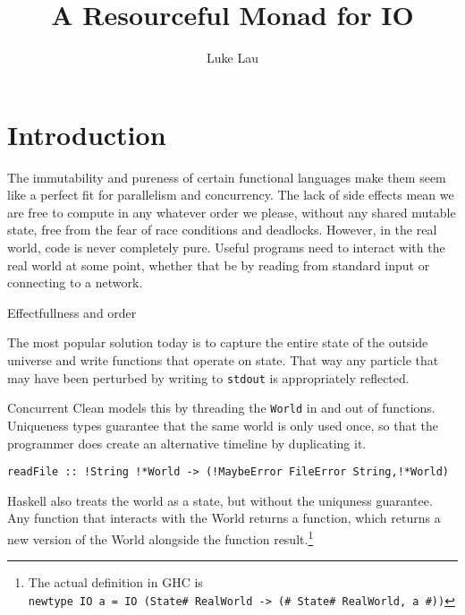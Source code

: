 \documentclass{report}
\begin{document}
\newcommand{\llbracket}{[\![}
\newcommand{\rrbracket}{]\!]}
\newcommand{\IO}{\mathsf{IO}}
\newcommand{\bind}{>\!\!>\!\!=} \newcommand{\concbind}{>\!\!>\!>\!\!=}
\newcommand{\subtyp}{\geq:}
\newcommand{\notsubtyp}{\ngeq:}
\newcommand{\lift}[1]{\ensuremath{\llbracket#1\rrbracket}}
\newcommand{\use}[2]{\ensuremath{\llbracket#2\rrbracket_{#1}}}

\author{Luke Lau}
\title{A Resourceful Monad for IO}
\begin{titlepage}
  \maketitle
\end{titlepage}

\chapter{Introduction}
The immutability and pureness of certain functional languages make them seem
like a perfect fit for parallelism and concurrency. The lack of side effects
mean we are free to compute in any whatever order we please, without any shared
mutable state, free from the fear of race conditions and deadlocks. However, in
the real world, code is never completely pure. Useful programs need to interact
with the real world at some point, whether that be by reading from standard
input or connecting to a network. 

Effectfullness and order

The most popular solution today is to capture the entire state of the outside
universe and write functions that operate on state. That way any particle that
may have been perturbed by writing to \texttt{stdout} is appropriately reflected.

Concurrent Clean models this by threading the \texttt{World} in and out of
functions. Uniqueness types guarantee that the same world is only used once, so
that the programmer does create an alternative timeline by duplicating it.

\begin{verbatim}
readFile :: !String !*World -> (!MaybeError FileError String,!*World)
\end{verbatim}

Haskell also treats the world as a state, but without the uniquness guarantee.
Any function that interacts with the World returns a function, which returns a
new version of the World alongside the function result.\footnote{The actual
  definition in GHC is \\ \texttt{newtype IO a = IO (State#
    RealWorld -> (# State# RealWorld, a #))}}
\end{document}
